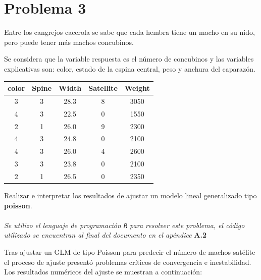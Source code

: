 \newpage

\section*{Problema \textcolor{CIMATRed}{3}}

Entre los cangrejos cacerola se sabe que cada hembra tiene un macho en su nido, pero puede tener más machos concubinos.

Se considera que la variable respuesta es el número de concubinos y las variables explicativas son: color, estado de la espina central, peso y anchura del caparazón.

\begin{center}
\begin{tabular}{ccccc}
\toprule
\textbf{color} & \textbf{Spine} & \textbf{Width} & \textbf{Satellite} & \textbf{Weight} \\
\midrule
3 & 3 & 28.3 & 8 & 3050 \\
4 & 3 & 22.5 & 0 & 1550 \\
2 & 1 & 26.0 & 9 & 2300 \\
4 & 3 & 24.8 & 0 & 2100 \\
4 & 3 & 26.0 & 4 & 2600 \\
3 & 3 & 23.8 & 0 & 2100 \\
2 & 1 & 26.5 & 0 & 2350 \\
\bottomrule
\end{tabular}
\end{center}

Realizar e interpretar los resultados de ajustar un modelo lineal generalizado tipo \textbf{poisson}.\\

\noindent{}\\

\textit{Se utilizo el lenguaje de programación \texttt{R} para resolver este problema, el código utilizado se encuentran al final del documento en el apéndice} \textbf{A.2}

Tras ajustar un GLM de tipo Poisson para predecir el número de machos satélite el proceso de ajuste presentó problemas críticos de convergencia e inestabilidad. Los resultados numéricos del ajuste se muestran a continuación: 

